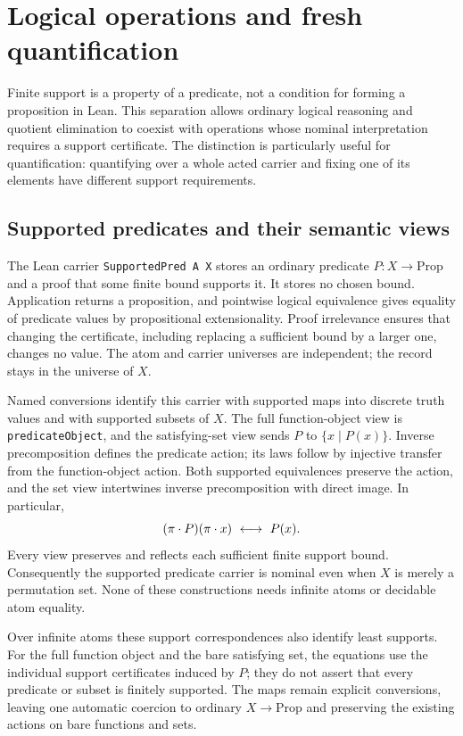\section{Logical operations and fresh quantification}
\label{sec:predicate-calculus}

Finite support is a property of a predicate, not a condition for forming a
proposition in Lean. This separation allows ordinary logical reasoning and
quotient elimination to coexist with operations whose nominal interpretation
requires a support certificate. The distinction is particularly useful for
quantification: quantifying over a whole acted carrier and fixing one of its
elements have different support requirements.

\subsection{Supported predicates and their semantic views}

The Lean carrier \texttt{SupportedPred A X} stores an ordinary predicate
$P:X\to\mathrm{Prop}$ and a proof that some finite bound supports it.
It stores no chosen bound. Application returns a proposition, and pointwise
logical equivalence gives equality of predicate values by propositional
extensionality. Proof irrelevance ensures that changing the certificate,
including replacing a sufficient bound by a larger one, changes no value.
The atom and carrier universes are independent; the record stays in the
universe of $X$.

Named conversions identify this carrier with supported maps into discrete
truth values and with supported subsets of $X$. The full function-object view
is \texttt{predicateObject}, and the satisfying-set view sends $P$ to
$\{x\mid P(x)\}$. Inverse precomposition defines the predicate action;
its laws follow by injective transfer from the function-object action.
Both supported equivalences preserve the action, and the set view intertwines
inverse precomposition with direct image. In particular,
\[
 (\pi\act P)(\pi\act x)\ \longleftrightarrow\ P(x).
\]
Every view preserves and reflects each sufficient finite support bound.
Consequently the supported predicate carrier is nominal even when $X$ is
merely a permutation set. None of these constructions needs infinite atoms
or decidable atom equality.

Over infinite atoms these support correspondences also identify least
supports. For the full function object and the bare satisfying set, the
equations use the individual support certificates induced by $P$; they do
not assert that every predicate or subset is finitely supported. The maps
remain explicit conversions, leaving one automatic coercion to ordinary
$X\to\mathrm{Prop}$ and preserving the existing actions on bare functions
and sets.

